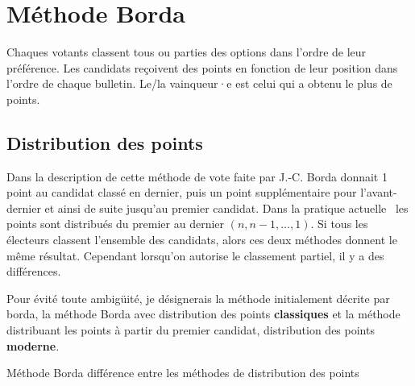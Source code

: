 \documentclass[../report]{subfiles}
\begin{document}
  \section{Méthode Borda}
  
  Chaques votants classent tous ou parties des options dans l'ordre de leur préférence.
  Les candidats reçoivent des points en fonction de leur position dans l'ordre de chaque bulletin.
  Le/la vainqueur·e est celui qui a obtenu le plus de points.

  \subsection{Distribution des points}

  Dans la description de cette méthode de vote faite par J.-C. Borda donnait 1 point au
  candidat classé en dernier, puis un point supplémentaire pour l'avant-dernier et ainsi
  de suite jusqu'au premier candidat.
  Dans la pratique actuelle~\cite{emerson_original_2013} les points sont distribués du 
  premier au dernier $(n, n-1, …, 1)$.
  Si tous les électeurs classent l'ensemble des candidats, alors ces deux méthodes donnent le même 
  résultat. Cependant lorsqu'on autorise le classement partiel, il y a des différences.

  Pour évité toute ambigüité, je désignerais la méthode initialement décrite par borda, 
  la méthode Borda avec distribution des points \textbf{classiques} et la méthode distribuant
  les points à partir du premier candidat, distribution des points \textbf{moderne}.

  \begin{table}
    \begin{center}
      \caption{Méthode Borda différence entre les méthodes de distribution des points}%
      \label{fig:diff:borda:caslim2}
    \end{center}
  \end{table}
\end{document}
